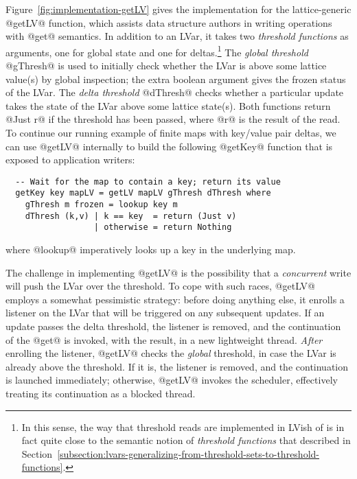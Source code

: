 Figure~\ref{fig:implementation-getLV} gives the implementation for the
lattice-generic @getLV@ function, which assists data structure authors
in writing operations with @get@ semantics.  In addition to an LVar,
it takes two \emph{threshold functions} as arguments, one for global
state and one for deltas.\footnote{In this sense, the way that
  threshold reads are implemented in LVish of is in fact quite close
  to the semantic notion of \emph{threshold functions} that 
  described in
  Section~\ref{subsection:lvars-generalizing-from-threshold-sets-to-threshold-functions}.}
The \emph{global threshold} @gThresh@ is used to initially check
whether the LVar is above some lattice value(s) by global inspection;
the extra boolean argument gives the frozen status of the LVar.  The
\emph{delta threshold} @dThresh@ checks whether a particular update
takes the state of the LVar above some lattice state(s).  Both
functions return @Just r@ if the threshold has been passed, where @r@
is the result of the read.  To continue our running example of finite
maps with key/value pair deltas, we can use @getLV@ internally to
build the following @getKey@ function that is exposed to application
writers:

\singlespacing
\begin{lstlisting}
  -- Wait for the map to contain a key; return its value
  getKey key mapLV = getLV mapLV gThresh dThresh where
    gThresh m frozen = lookup key m
    dThresh (k,v) | k == key  = return (Just v)
                  | otherwise = return Nothing 
\end{lstlisting}
\doublespacing

where @lookup@ imperatively looks up a key in the underlying map.

The challenge in implementing @getLV@ is the possibility that a
\emph{concurrent} write will push the LVar over the threshold.  To
cope with such races, @getLV@ employs a somewhat pessimistic strategy:
before doing anything else, it enrolls a listener on the LVar that
will be triggered on any subsequent updates.  If an update passes the
delta threshold, the listener is removed, and the continuation of the
@get@ is invoked, with the result, in a new lightweight thread.
\emph{After} enrolling the listener, @getLV@ checks the \emph{global}
threshold, in case the LVar is already above the threshold.  If it is,
the listener is removed, and the continuation is launched immediately;
otherwise, @getLV@ invokes the scheduler, effectively treating its
continuation as a blocked thread.

